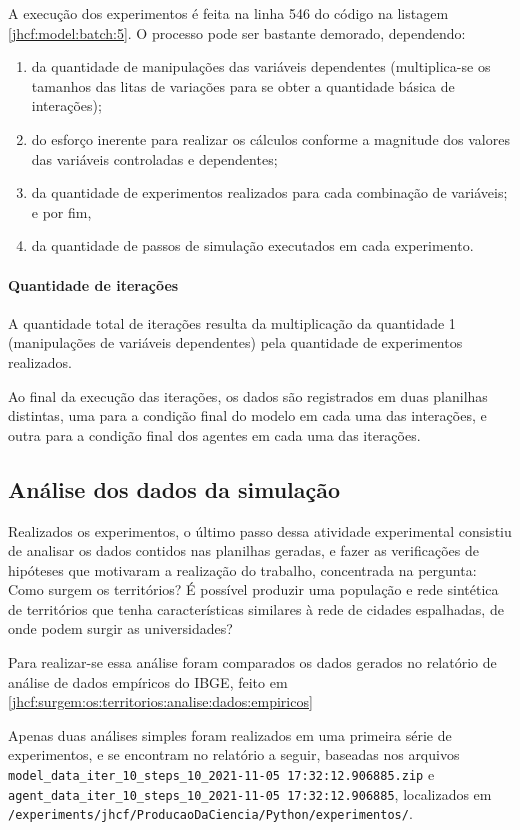 A execução dos experimentos é feita na linha 546 do código na listagem \ref{jhcf:model:batch:5}.
O processo pode ser bastante demorado, dependendo:
\begin{enumerate}
    \item da quantidade de manipulações das variáveis dependentes (multiplica-se os tamanhos das litas de variações para se obter a quantidade básica de interações);
    \item do esforço inerente para realizar os cálculos conforme a magnitude dos valores das variáveis controladas e dependentes;
    \item da quantidade de experimentos realizados para cada combinação de variáveis; e por fim,
    \item da quantidade de passos de simulação executados em cada experimento.
\end{enumerate}

\paragraph{Quantidade de iterações}

A quantidade total de iterações resulta da multiplicação da quantidade 1 (manipulações de variáveis dependentes) pela quantidade de experimentos realizados.

Ao final da execução das iterações, os dados são registrados em duas planilhas distintas, uma para a condição final do modelo em cada uma das interações, e outra para a condição final dos agentes em cada uma das iterações.

\subsection{Análise dos dados da simulação}

Realizados os experimentos, o último passo dessa atividade experimental consistiu de analisar os dados contidos nas planilhas geradas, e fazer as verificações de hipóteses que motivaram a realização do trabalho, concentrada na pergunta: Como surgem os territórios? É possível produzir uma população e rede sintética de territórios que tenha características similares à rede de cidades espalhadas, de onde podem surgir as universidades? 

Para realizar-se essa análise foram comparados os dados gerados no relatório de análise de dados empíricos do IBGE, feito em \ref{jhcf:surgem:os:territorios:analise:dados:empiricos}

Apenas duas análises simples foram realizados em uma primeira série de experimentos, e se encontram no relatório a seguir, baseadas nos arquivos \verb|model_data_iter_10_steps_10_2021-11-05 17:32:12.906885.zip| e \verb|agent_data_iter_10_steps_10_2021-11-05 17:32:12.906885|, localizados em \verb|/experiments/jhcf/ProducaoDaCiencia/Python/experimentos/|.

